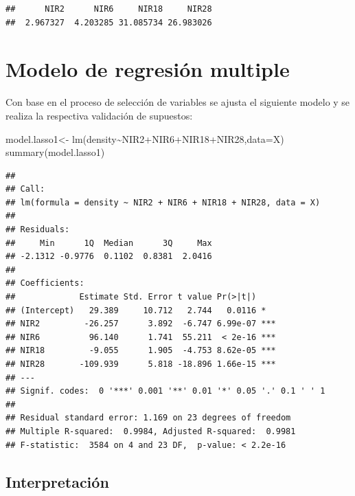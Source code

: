 \documentclass[
]{article}
\newenvironment{Shaded}{\begin{snugshade}}{\end{snugshade}}
\newcommand{\AttributeTok}[1]{\textcolor[rgb]{0.77,0.63,0.00}{#1}}
\newcommand{\FunctionTok}[1]{\textcolor[rgb]{0.00,0.00,0.00}{#1}}
\newcommand{\NormalTok}[1]{#1}
\newcommand{\OtherTok}[1]{\textcolor[rgb]{0.56,0.35,0.01}{#1}}
\newcommand{\SpecialCharTok}[1]{\textcolor[rgb]{0.00,0.00,0.00}{#1}}
\begin{document}
\begin{verbatim}
##      NIR2      NIR6     NIR18     NIR28 
##  2.967327  4.203285 31.085734 26.983026
\end{verbatim}

\hypertarget{modelo-de-regresiuxf3n-multiple}{%
\section{Modelo de regresión
multiple}\label{modelo-de-regresiuxf3n-multiple}}

Con base en el proceso de selección de variables se ajusta el siguiente
modelo y se realiza la respectiva validación de supuestos:

\begin{Shaded}
\begin{Highlighting}[]
\NormalTok{model.lasso1}\OtherTok{\textless{}{-}} \FunctionTok{lm}\NormalTok{(density}\SpecialCharTok{\textasciitilde{}}\NormalTok{NIR2}\SpecialCharTok{+}\NormalTok{NIR6}\SpecialCharTok{+}\NormalTok{NIR18}\SpecialCharTok{+}\NormalTok{NIR28,}\AttributeTok{data=}\NormalTok{X)}
\FunctionTok{summary}\NormalTok{(model.lasso1)}
\end{Highlighting}
\end{Shaded}

\begin{verbatim}
## 
## Call:
## lm(formula = density ~ NIR2 + NIR6 + NIR18 + NIR28, data = X)
## 
## Residuals:
##     Min      1Q  Median      3Q     Max 
## -2.1312 -0.9776  0.1102  0.8381  2.0416 
## 
## Coefficients:
##             Estimate Std. Error t value Pr(>|t|)    
## (Intercept)   29.389     10.712   2.744   0.0116 *  
## NIR2         -26.257      3.892  -6.747 6.99e-07 ***
## NIR6          96.140      1.741  55.211  < 2e-16 ***
## NIR18         -9.055      1.905  -4.753 8.62e-05 ***
## NIR28       -109.939      5.818 -18.896 1.66e-15 ***
## ---
## Signif. codes:  0 '***' 0.001 '**' 0.01 '*' 0.05 '.' 0.1 ' ' 1
## 
## Residual standard error: 1.169 on 23 degrees of freedom
## Multiple R-squared:  0.9984, Adjusted R-squared:  0.9981 
## F-statistic:  3584 on 4 and 23 DF,  p-value: < 2.2e-16
\end{verbatim}

\hypertarget{interpretaciuxf3n}{%
\subsection{Interpretación}\label{interpretaciuxf3n}}
\end{document}
